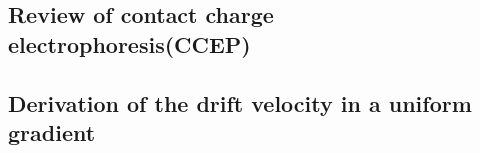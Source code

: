 \begin{appendices}



\chapter{Review of contact charge electrophoresis(CCEP)}
\section{Derivation of the drift velocity in a uniform gradient}





\end{appendices}